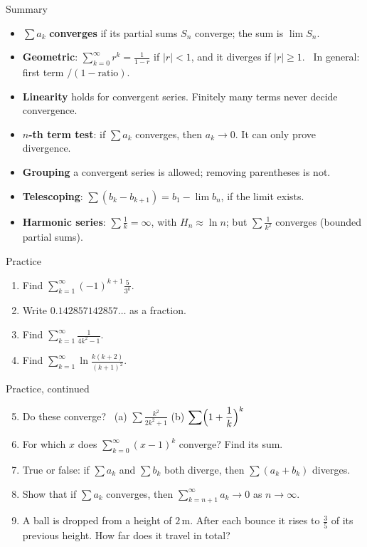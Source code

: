 \documentclass[10pt]{wosm-slides}
\begin{document}
\begin{frame}{Summary}
  \begin{itemize}
    \item $\sum a_k$ \textbf{converges} if its partial sums $S_n$ converge;
      the sum is $\lim S_n$.
    \item \textbf{Geometric}: $\sum_{k=0}^\infty r^k = \frac{1}{1-r}$ if $|r| < 1$, and
      it diverges if $|r| \ge 1$. \ In general: first term $/ (1 - \text{ratio})$.
    \item \textbf{Linearity} holds for convergent series.
      Finitely many terms never decide convergence.
    \item \textbf{$n$-th term test}: if $\sum a_k$ converges, then $a_k \to 0$.
      It can only prove divergence.
    \item \textbf{Grouping} a convergent series is allowed; removing parentheses is not.
    \item \textbf{Telescoping}: $\sum (b_k - b_{k+1}) = b_1 - \lim b_n$, if the limit exists.
    \item \textbf{Harmonic series}: $\sum \frac1k = \infty$, with $H_n \approx \ln n$;
      but $\sum \frac1{k^2}$ converges (bounded partial sums).
  \end{itemize}
\end{frame}

\begin{frame}{Practice}
  \small
  \begin{enumerate}
    \item Find $\displaystyle\sum_{k=1}^\infty (-1)^{k+1} \frac{5}{3^k}$.
    \item Write $0.142857142857\ldots$ as a fraction.
    \item Find $\displaystyle\sum_{k=1}^\infty \frac{1}{4k^2 - 1}$.
    \item Find $\displaystyle\sum_{k=1}^\infty \ln \frac{k(k+2)}{(k+1)^2}$.
  \end{enumerate}
\end{frame}

\begin{frame}{Practice, continued}
  \small
  \begin{enumerate}
    \setcounter{enumi}{4}
    \item Do these converge? \ (a) $\displaystyle\sum \frac{k^2}{2k^2 + 1}$ \quad
      (b) $\displaystyle\sum \Bigl(1 + \frac1k\Bigr)^k$
    \item For which $x$ does $\sum_{k=0}^\infty (x-1)^k$ converge? Find its sum.
    \item True or false: if $\sum a_k$ and $\sum b_k$ both diverge, then
      $\sum (a_k + b_k)$ diverges.
    \item Show that if $\sum a_k$ converges, then $\sum_{k=n+1}^\infty a_k \to 0$ as $n \to \infty$.
    \item A ball is dropped from a height of $2$\,m. After each bounce it rises to
      $\frac35$ of its previous height. How far does it travel in total?
  \end{enumerate}
\end{frame}
\end{document}
